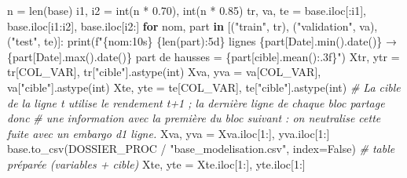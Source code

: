 \documentclass[
  10pt,
]{article}
\newenvironment{Shaded}{}{}
\newcommand{\BuiltInTok}[1]{\textcolor[rgb]{0.00,0.50,0.00}{#1}}
\newcommand{\CommentTok}[1]{\textcolor[rgb]{0.38,0.63,0.69}{\textit{#1}}}
\newcommand{\ControlFlowTok}[1]{\textcolor[rgb]{0.00,0.44,0.13}{\textbf{#1}}}
\newcommand{\DecValTok}[1]{\textcolor[rgb]{0.25,0.63,0.44}{#1}}
\newcommand{\FloatTok}[1]{\textcolor[rgb]{0.25,0.63,0.44}{#1}}
\newcommand{\KeywordTok}[1]{\textcolor[rgb]{0.00,0.44,0.13}{\textbf{#1}}}
\newcommand{\NormalTok}[1]{#1}
\newcommand{\OperatorTok}[1]{\textcolor[rgb]{0.40,0.40,0.40}{#1}}
\newcommand{\SpecialCharTok}[1]{\textcolor[rgb]{0.25,0.44,0.63}{#1}}
\newcommand{\SpecialStringTok}[1]{\textcolor[rgb]{0.73,0.40,0.53}{#1}}
\newcommand{\StringTok}[1]{\textcolor[rgb]{0.25,0.44,0.63}{#1}}
\newcommand{\VariableTok}[1]{\textcolor[rgb]{0.10,0.09,0.49}{#1}}
\begin{document}
\begin{Shaded}
\begin{Highlighting}[]
\NormalTok{n }\OperatorTok{=} \BuiltInTok{len}\NormalTok{(base)}
\NormalTok{i1, i2 }\OperatorTok{=} \BuiltInTok{int}\NormalTok{(n }\OperatorTok{*} \FloatTok{0.70}\NormalTok{), }\BuiltInTok{int}\NormalTok{(n }\OperatorTok{*} \FloatTok{0.85}\NormalTok{)}
\NormalTok{tr, va, te }\OperatorTok{=}\NormalTok{ base.iloc[:i1], base.iloc[i1:i2], base.iloc[i2:]}
\ControlFlowTok{for}\NormalTok{ nom, part }\KeywordTok{in}\NormalTok{ [(}\StringTok{"train"}\NormalTok{, tr), (}\StringTok{"validation"}\NormalTok{, va), (}\StringTok{"test"}\NormalTok{, te)]:}
    \BuiltInTok{print}\NormalTok{(}\SpecialStringTok{f"}\SpecialCharTok{\{}\NormalTok{nom}\SpecialCharTok{:10s\}}\SpecialStringTok{ }\SpecialCharTok{\{}\BuiltInTok{len}\NormalTok{(part)}\SpecialCharTok{:5d\}}\SpecialStringTok{ lignes  }\SpecialCharTok{\{}\NormalTok{part[}\StringTok{\textquotesingle{}Date\textquotesingle{}}\NormalTok{]}\SpecialCharTok{.}\BuiltInTok{min}\NormalTok{()}\SpecialCharTok{.}\NormalTok{date()}\SpecialCharTok{\}}\SpecialStringTok{ → }\SpecialCharTok{\{}\NormalTok{part[}\StringTok{\textquotesingle{}Date\textquotesingle{}}\NormalTok{]}\SpecialCharTok{.}\BuiltInTok{max}\NormalTok{()}\SpecialCharTok{.}\NormalTok{date()}\SpecialCharTok{\}}\SpecialStringTok{  part de hausses = }\SpecialCharTok{\{}\NormalTok{part[}\StringTok{\textquotesingle{}cible\textquotesingle{}}\NormalTok{]}\SpecialCharTok{.}\NormalTok{mean()}\SpecialCharTok{:.3f\}}\SpecialStringTok{"}\NormalTok{)}
\NormalTok{Xtr, ytr }\OperatorTok{=}\NormalTok{ tr[COL\_VAR], tr[}\StringTok{"cible"}\NormalTok{].astype(}\BuiltInTok{int}\NormalTok{)}
\NormalTok{Xva, yva }\OperatorTok{=}\NormalTok{ va[COL\_VAR], va[}\StringTok{"cible"}\NormalTok{].astype(}\BuiltInTok{int}\NormalTok{)}
\NormalTok{Xte, yte }\OperatorTok{=}\NormalTok{ te[COL\_VAR], te[}\StringTok{"cible"}\NormalTok{].astype(}\BuiltInTok{int}\NormalTok{)}
\CommentTok{\# La cible de la ligne t utilise le rendement t+1 ; la dernière ligne de chaque bloc partage donc}
\CommentTok{\# une information avec la première du bloc suivant : on neutralise cette fuite avec un embargo d\textquotesingle{}1 ligne.}
\NormalTok{Xva, yva }\OperatorTok{=}\NormalTok{ Xva.iloc[}\DecValTok{1}\NormalTok{:], yva.iloc[}\DecValTok{1}\NormalTok{:]}
\NormalTok{base.to\_csv(DOSSIER\_PROC }\OperatorTok{/} \StringTok{"base\_modelisation.csv"}\NormalTok{, index}\OperatorTok{=}\VariableTok{False}\NormalTok{)   }\CommentTok{\# table préparée (variables + cible)}
\NormalTok{Xte, yte }\OperatorTok{=}\NormalTok{ Xte.iloc[}\DecValTok{1}\NormalTok{:], yte.iloc[}\DecValTok{1}\NormalTok{:]}
\end{Highlighting}
\end{Shaded}
\end{document}
